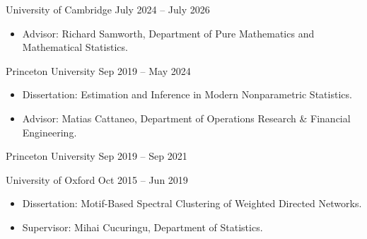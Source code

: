 \documentclass[
  date,
  number,
]{wgu-cv}
\begin{document}
\maketitle


\setlength{\emergencystretch}{2pt}


{University of Cambridge}
{July 2024 -- July 2026}

\begin{itemize}
  \item Advisor:
    Richard Samworth, Department of Pure Mathematics
    and Mathematical Statistics.
\end{itemize}

{Princeton University}
{Sep 2019 -- May 2024}

\begin{itemize}
  \item Dissertation:
    Estimation and Inference in Modern Nonparametric Statistics.
  \item Advisor:
    Matias Cattaneo, Department of Operations Research \& Financial Engineering.
\end{itemize}

{Princeton University}
{Sep 2019 -- Sep 2021}

\bigskip

{University of Oxford}
{Oct 2015 -- Jun 2019}

\begin{itemize}
  \item Dissertation:
    Motif-Based Spectral Clustering of Weighted Directed Networks.
  \item Supervisor:
    Mihai Cucuringu,
    Department of Statistics.
\end{itemize}

\vspace*{-4mm}

\end{document}
